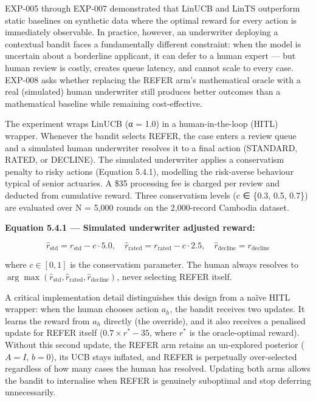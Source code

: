 EXP-005 through EXP-007 demonstrated that LinUCB and LinTS outperform static baselines on synthetic data where the optimal reward for every action is immediately observable. In practice, however, an underwriter deploying a contextual bandit faces a fundamentally different constraint: when the model is uncertain about a borderline applicant, it can defer to a human expert --- but human review is costly, creates queue latency, and cannot scale to every case. EXP-008 asks whether replacing the REFER arm's mathematical oracle with a real (simulated) human underwriter still produces better outcomes than a mathematical baseline while remaining cost-effective.

The experiment wraps LinUCB (α = 1.0) in a human-in-the-loop (HITL) wrapper. Whenever the bandit selects REFER, the case enters a review queue and a simulated human underwriter resolves it to a final action (STANDARD, RATED, or DECLINE). The simulated underwriter applies a conservatism penalty to risky actions (Equation 5.4.1), modelling the risk-averse behaviour typical of senior actuaries. A \$35 processing fee is charged per review and deducted from cumulative reward. Three conservatism levels (c ∈ \{0.3, 0.5, 0.7\}) are evaluated over N = 5,000 rounds on the 2,000-record Cambodia dataset.

\textbf{Equation 5.4.1 --- Simulated underwriter adjusted reward:}

\[\hat{r}_\text{std} = r_\text{std} - c \cdot 5.0, \quad \hat{r}_\text{rated} = r_\text{rated} - c \cdot 2.5, \quad \hat{r}_\text{decline} = r_\text{decline}\]

where \(c \in [0,1]\) is the conservatism parameter. The human always resolves to \(\arg\max(\hat{r}_\text{std}, \hat{r}_\text{rated}, \hat{r}_\text{decline})\), never selecting REFER itself.

A critical implementation detail distinguishes this design from a naïve HITL wrapper: when the human chooses action \(a_h\), the bandit receives two updates. It learns the reward from \(a_h\) directly (the override), and it also receives a penalised update for REFER itself (\(0.7 \times r^\ast - 35\), where \(r^\ast\) is the oracle-optimal reward). Without this second update, the REFER arm retains an un-explored posterior (\(A = I\), \(b = 0\)), its UCB stays inflated, and REFER is perpetually over-selected regardless of how many cases the human has resolved. Updating both arms allows the bandit to internalise when REFER is genuinely suboptimal and stop deferring unnecessarily.

